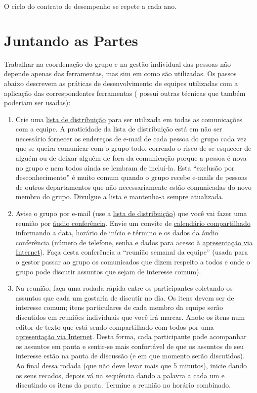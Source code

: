 \documentclass[12pt]{article} %
\begin{document}
O ciclo do contrato de desempenho se repete a cada ano.


\section{\fontsize{12}{12}\textbf{Juntando as Partes}}

Trabalhar na coordenação do grupo e na gestão individual das pessoas não depende apenas das ferramentas, mas sim em como são utilizadas. Os passos abaixo descrevem as práticas de desenvolvimento de equipes utilizadas com a aplicação das correspondentes ferramentas (\cite{winter} possui outras técnicas que também poderiam ser usadas):

\begin{enumerate}

\item Crie uma \underline{lista de distribuição} para ser utilizada em todas as comunicações com a equipe. A praticidade da lista de 
	distribuição está em não ser necessário fornecer os endereços de e-mail de cada pessoa do grupo cada vez 
	que se queira comunicar com o grupo todo, correndo o risco de se
	esquecer de alguém ou de deixar alguém de fora da comunicação porque a pessoa é
	nova no grupo e nem todos ainda se lembram de incluí-la. Esta ``exclusão por desconhecimento''
	é muito comum quando o grupo recebe e-mails de pessoas de outros departamentos
	que não necessariamente estão comunicadas do novo membro do grupo. Divulgue a lista
	e mantenha-a sempre atualizada. 

\item Avise o grupo por e-mail (use a \underline{lista de distribuição})
	que você vai fazer uma reunião por \underline{áudio conferência}. Envie um convite de \underline{calendário compartilhado} informando
	 a data, horário de início e término e os dados da áudio conferência (número de telefone, senha e dados para
	acesso à 	\underline{apresentação via Internet}). Faça desta conferência a ``reunião
    semanal da equipe'' (usada para o gestor passar ao grupo os comunicados que dizem respeito
    a todos e onde o grupo pode discutir assuntos que sejam de interesse comum).

\item Na reunião, faça uma rodada rápida entre os participantes 
		coletando os assuntos que cada um gostaria de discutir no dia. Os itens devem ser
		de interesse comum; itens particulares de cada membro da equipe serão discutidos
		em reuniões individuais que você irá marcar. Anote os itens num editor
		de texto que está sendo compartilhado com todos por uma \underline{apresentação via Internet}.
		Desta forma, cada participante pode acompanhar os assuntos em pauta e sentir-se
		mais confortável de que os assuntos de seu interesse estão na pauta de discussão (e em que momento serão discutidos).
		Ao final dessa rodada (que não deve levar mais que 5 minutos), inicie dando os seus recados,
		depois vá na sequência dando a palavra a cada um e discutindo os itens da pauta. 
		Termine a reunião no horário combinado.


\end{enumerate}
\end{document}
